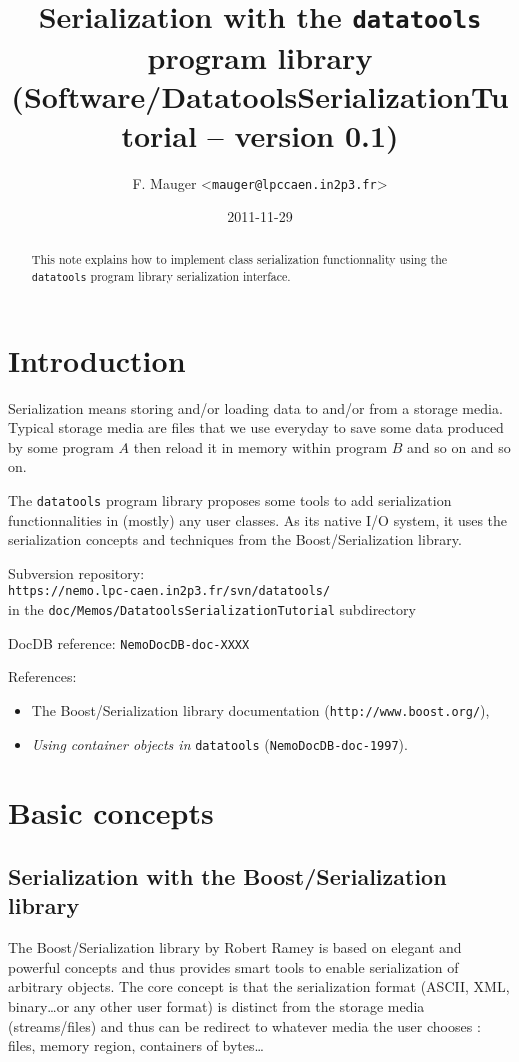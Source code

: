 \documentclass[a4paper,12pt]{article}
\title{Serialization with the \texttt{datatools} program library\\%
{\small{(Software/DatatoolsSerializationTutorial -- version 0.1)}}}
\author{F. Mauger <\texttt{mauger@lpccaen.in2p3.fr}>}
\date{2011-11-29}
\newcommand{\pn}{\par\noindent}
\begin{document}
\maketitle

\begin{abstract}
This note  explains how to implement class serialization functionnality
using the \texttt{datatools} program library serialization interface.
\end{abstract}

\section{Introduction}

\pn Serialization means  storing and/or loading data to  and/or from a
storage media. Typical storage media are files that we use everyday to
save some data  produced by some program $A$ then  reload it in memory
within program $B$ and so on and so on.

\pn The \texttt{datatools} program  library proposes some tools to add
serialization functionnalities  in (mostly)  any user classes.  As its
native I/O  system, it uses the serialization  concepts and techniques
from the Boost/Serialization library.


\vskip 5mm
\pn
Subversion repository:\\
\texttt{https://nemo.lpc-caen.in2p3.fr/svn/datatools/} \\
in the \texttt{doc/Memos/DatatoolsSerializationTutorial} subdirectory
\pn
DocDB reference: \texttt{NemoDocDB-doc-XXXX}
\pn
References: 
\begin{itemize}
\item The Boost/Serialization library documentation (\texttt{http://www.boost.org/}),
\item \textit{Using container objects in} \texttt{datatools}
(\texttt{NemoDocDB-doc-1997}).
\end{itemize}
\clearpage

\section{Basic concepts}

\subsection{Serialization with the Boost/Serialization  library}

The Boost/Serialization  library by Robert  Ramey is based  on elegant
and  powerful  concepts  and  thus  provides  smart  tools  to  enable
serialization  of arbitrary  objects.  The  core concept  is  that the
serialization  format  (ASCII,  XML,  binary\dots or  any  other  user
format) is  distinct from the  storage media (streams/files)  and thus
can be  redirect to  whatever media the  user chooses :  files, memory
region, containers of bytes\dots
\end{document}
